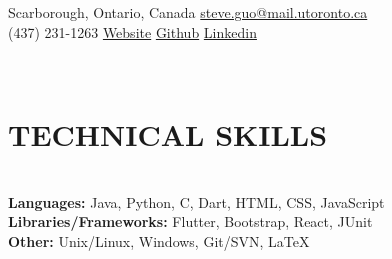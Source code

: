 \documentclass[12pt,letterpaper,roman]{moderncv}
\def \scaleFont {1.17} %
\def \spaceTop {12.5mm}
\def \headingSpace {-11mm}
\def \skillSpacing {1mm}
\def \sectionSpacing {-10mm}
\begin{document}
\newpage
{} %
\relscale{\scaleFont} %
\makecvtitle
\vspace*{-27mm} 

\begin{center} 
	\faMapO\enspace Scarborough, Ontario, Canada  \qquad \faEnvelopeO\enspace \href{mailto:steve.guo@mail.utoronto.ca}{steve.guo@mail.utoronto.ca} \\
	\faMobile\enspace (437) 231-1263  \hspace*{\spaceTop}  \href{https://epicsteve2.github.io/}{\faGlobe\enspace Website}   \hspace*{\spaceTop}  \href{https://github.com/Epicsteve2}{\faGithub\enspace Github}   \hspace*{\spaceTop}  \href{https://www.linkedin.com/in/stephen-guo-399959192/}{\faLinkedin\enspace Linkedin}\\
\end{center} \leavevmode\\[-24mm]

\section{TECHNICAL SKILLS} \leavevmode \\[\headingSpace] 
\textbf{Languages:} Java,\hspace*{\skillSpacing} Python,\hspace*{\skillSpacing} C,\hspace*{\skillSpacing} Dart,\hspace*{\skillSpacing} HTML,\hspace*{\skillSpacing} CSS,\hspace*{\skillSpacing} JavaScript \\
\textbf{Libraries/Frameworks:} Flutter,\hspace*{\skillSpacing} Bootstrap,\hspace*{\skillSpacing} React,\hspace*{\skillSpacing } JUnit \\
\textbf{Other:} Unix/Linux,\hspace*{\skillSpacing} Windows,\hspace*{\skillSpacing} Git/SVN,\hspace*{\skillSpacing} LaTeX
\\[\sectionSpacing]
\end{document}

